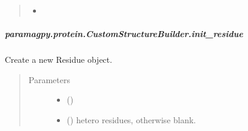 \documentclass[a4paper,10pt,english,openany,oneside]{sphinxmanual}
\begin{document}
\begin{fulllineitems}
\begin{fulllineitems}
\begin{fulllineitems}
\begin{quote}
\begin{description}
\begin{itemize}
\item {} 
\sphinxAtStartPar
{} \textendash{} 

\end{itemize}

\end{description}\end{quote}

\end{fulllineitems}



\subparagraph{paramagpy.protein.CustomStructureBuilder.init\_residue}
\label{\detokenize{reference/generated/paramagpy.protein.CustomStructureBuilder.init_residue:paramagpy-protein-customstructurebuilder-init-residue}}\label{\detokenize{reference/generated/paramagpy.protein.CustomStructureBuilder.init_residue::doc}}

\begin{fulllineitems}
\label{\detokenize{reference/generated/paramagpy.protein.CustomStructureBuilder.init_residue:paramagpy.protein.CustomStructureBuilder.init_residue}}
\sphinxAtStartPar
Create a new Residue object.
\begin{quote}\begin{description}
\item[{Parameters}] \leavevmode\begin{itemize}
\item {} 
\sphinxAtStartPar
{} (\sphinxstyleliteralemphasis{\sphinxupquote{, }}) \textendash{} 

\item {} 
\sphinxAtStartPar
{} (\sphinxstyleliteralemphasis{\sphinxupquote{, }}\sphinxstyleliteralemphasis{\sphinxupquote{, }}) \textendash{} hetero residues, otherwise blank.


\end{itemize}
\end{description}
\end{quote}
\end{fulllineitems}
\end{fulllineitems}
\end{fulllineitems}
\end{document}
